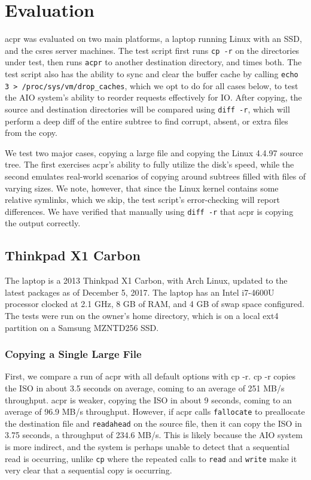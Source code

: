 \documentclass[11pt]{article}
\begin{document}
\section{Evaluation}
acpr was evaluated on two main platforms, a laptop running Linux with an SSD, and the csres server machines. The test script first runs \texttt{cp -r} on the directories under test, then runs \texttt{acpr} to another destination directory, and times both. The test script also has the ability to sync and clear the buffer cache by calling \texttt{echo 3 > /proc/sys/vm/drop\_caches}, which we opt to do for all cases below, to test the AIO system's ability to reorder requests effectively for IO. After copying, the source and destination directories will be compared using \texttt{diff -r}, which will perform a deep diff of the entire subtree to find corrupt, absent, or extra files from the copy.

We test two major cases, copying a large file and copying the Linux 4.4.97 source tree. The first exercises acpr's ability to fully utilize the disk's speed, while the second emulates real-world scenarios of copying around subtrees filled with files of varying sizes. We note, however, that since the Linux kernel contains some relative symlinks, which we skip, the test script's error-checking will report differences. We have verified that manually using \texttt{diff -r} that acpr is copying the output correctly. 

\subsection{Thinkpad X1 Carbon}
The laptop is a 2013 Thinkpad X1 Carbon, with Arch Linux, updated to the latest packages as of December 5, 2017. The laptop has an Intel i7-4600U processor clocked at 2.1 GHz, 8 GB of RAM, and 4 GB of swap space configured. The tests were run on the owner's home directory, which is on a local ext4 partition on a Samsung MZNTD256 SSD.

\subsubsection{Copying a Single Large File}
First, we compare a run of acpr with all default options with cp -r. cp -r copies the ISO in about 3.5 seconds on average, coming to an average of 251 MB/s throughput. acpr is weaker, copying the ISO in about 9 seconds, coming to an average of 96.9 MB/s throughput. However, if acpr calls \texttt{fallocate} to preallocate the destination file and \texttt{readahead} on the source file, then it can copy the ISO in 3.75 seconds, a throughput of 234.6 MB/s. This is likely because the AIO system is more indirect, and the system is perhaps unable to detect that a sequential read is occurring, unlike \texttt{cp} where the repeated calls to \texttt{read} and \texttt{write} make it very clear that a sequential copy is occurring.
\end{document}

